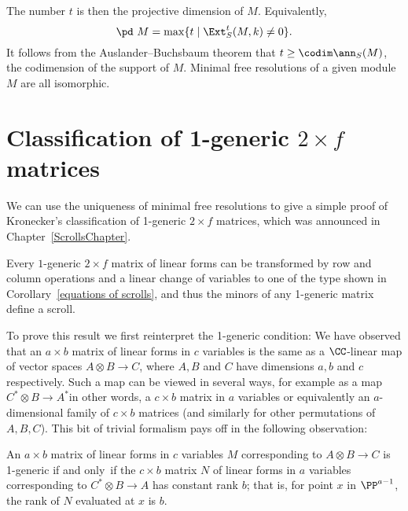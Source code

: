 The number $t$ is then the projective dimension of $M$.
Equivalently,
$$
\pd\ M = \max\{t \mid \Ext_S^t(M,k) \neq 0 \}.
$$
It follows from the Auslander--Buchsbaum
%
theorem \cite[Theorem 19.9]{Eisenbud1995} that $t \geq \codim \ann_S(M)$,
the codimension of the support of $M$.
Minimal free resolutions of a given module $M$ are all isomorphic.

\section{Classification of 1-generic \texorpdfstring{$2\times f$}{2 x f}
matrices}\label{Kronecker}

We can use the uniqueness of minimal free resolutions to give a simple
proof of Kronecker's classification of 1-generic $2\times f$
%
matrices, which was announced in Chapter~\ref{ScrollsChapter}.

\begin{theorem}\label{matrix pencils}
Every
$1$-generic $2 \times f$ matrix of linear forms can be transformed by
row and column operations and a linear change
of variables to one of the type shown in
Corollary~\ref{equations of scrolls}, and thus the minors of any 1-generic
matrix define a scroll.
\unif
\end{theorem}

To prove this result we first reinterpret the 1-generic condition:
We have observed that an
$a\times b$ matrix of linear forms in $c$ variables is the same as a
$\CC$-linear map of vector spaces
$A \otimes B \to C$, where $A, B$ and $C$ have dimensions $a,b$ and $c$
respectively. Such a map
can be viewed in several ways, for example as a map $C^{*} \otimes B\to
A^{*}$\emdash in other words, a $c\times b$ matrix in $a$ variables\emdash
or equivalently an $a$-dimensional family of $c\times b$ matrices (and
similarly for other permutations of $A,B,C$).
This bit of trivial formalism pays off in the following observation:

\begin{proposition}\label{reinterpretation of 1-generic}
An  $a\times b$ matrix of linear forms in $c$ variables $M$ corresponding
to $A\otimes B \to C$ is 1-generic if and only~if the $c \times b$ matrix
$N$ of linear forms in $a$ variables corresponding to $C^{*}\otimes B
\to A$ has constant rank $b$; that is,
for point $x$ in $\PP^{a-1}$, the rank of $N$ evaluated at $x$ is $b$.
\unif
\end{proposition}

